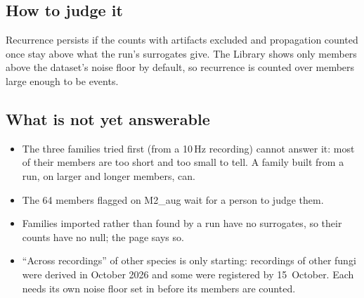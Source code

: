 \subsection*{How to judge it}
Recurrence persists if the counts with artifacts excluded and propagation counted once stay
above what the run's surrogates give. The Library shows only members above the dataset's
noise floor by default, so recurrence is counted over members large enough to be events.

\subsection*{What is not yet answerable}
\begin{itemize}
\item The three families tried first (from a 10\,Hz recording) cannot answer it: most of
  their members are too short and too small to tell. A family built from a run, on larger
  and longer members, can.
\item The 64 members flagged on M2\_aug wait for a person to judge them.
\item Families imported rather than found by a run have no surrogates, so their counts have
  no null; the page says so.
\item ``Across recordings'' of other species is only starting: recordings of other fungi
  were derived in October 2026 and some were registered by 15~October. Each needs its own
  noise floor set in  before its members are counted.
\end{itemize}
